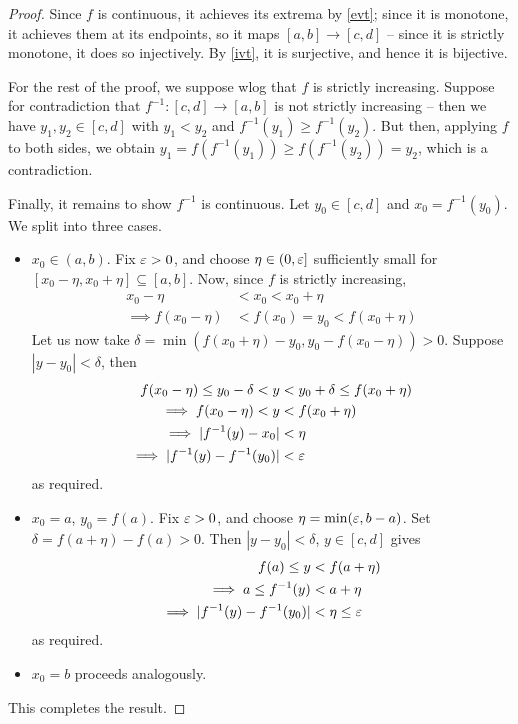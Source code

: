 \documentclass{../template/note}
\begin{document}
    \begin{proof}
        Since \(f\) is continuous, it achieves its extrema by \cref{evt}; since it is monotone, it achieves them at its endpoints, so it maps \([a, b] \to [c, d]\) -- since it is strictly monotone, it does so injectively. By \cref{ivt}, it is surjective, and hence it is bijective.

        For the rest of the proof, we suppose wlog that \(f\) is strictly increasing. Suppose for contradiction that \(f^{-1}: [c, d] \to [a, b]\) is not strictly increasing -- then we have \(y_1, y_2 \in [c, d]\) with \(y_1 < y_2\) and \(f^{-1}(y_1) \geq f^{-1}(y_2)\). But then, applying \(f\) to both sides, we obtain \(y_1 = f(f^{-1}(y_1)) \geq f(f^{-1}(y_2)) = y_2\), which is a contradiction.

        Finally, it remains to show \(f^{-1}\) is continuous. Let \(y_0 \in [c, d]\) and \(x_0 = f^{-1}(y_0)\). We split into three cases.
        \begin{itemize}
            \item \(x_0 \in (a, b)\). Fix \(\varepsilon > 0\), and choose \(\eta \in (0, \varepsilon]\) sufficiently small for \([x_0 - \eta, x_0 + \eta] \subseteq [a, b]\). Now, since \(f\) is strictly increasing,
            \begin{align*}
                x_0 - \eta &< x_0 < x_0 + \eta \\
                \implies f(x_0 - \eta) &< f(x_0) = y_0 < f(x_0 + \eta)
            \end{align*}
            Let us now take \(\delta = \min(f(x_0 + \eta) - y_0, y_0 - f(x_0 - \eta)) > 0\). Suppose \(|y-y_0| < \delta\), then
            \begin{align*}
                f(x_0 - \eta) \leq y_0 - \delta < y &< y_0 + \delta \leq f(x_0 + \eta) \\
                \implies f(x_0 - \eta) < y &< f(x_0 + \eta) \\
                \implies |f^{-1}(y) - x_0| &< \eta \\
                \implies |f^{-1}(y) - f^{-1}(y_0)| &< \varepsilon
            \end{align*}
            as required.
            \item \(x_0 = a\), \(y_0 = f(a)\). Fix \(\varepsilon > 0\), and choose \(\eta = \min(\varepsilon, b-a)\). Set \(\delta = f(a + \eta) - f(a) > 0\). Then \(|y-y_0| < \delta\), \(y \in [c, d]\) gives
            \begin{align*}
                f(a) \leq y &< f(a + \eta) \\
                \implies a \leq f^{-1}(y) &< a + \eta \\
                \implies |f^{-1}(y)-f^{-1}(y_0)| &< \eta \leq \varepsilon
            \end{align*}
            as required.
            \item \(x_0 = b\) proceeds analogously.               
        \end{itemize}
        This completes the result.        
    \end{proof}
    
\end{document}
